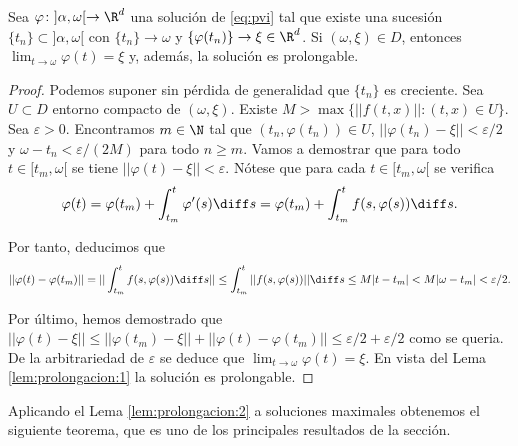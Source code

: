 \documentclass{article}
\begin{document}
\begin{lemma}\label{lem:prolongacion:2}
  Sea $\varphi \colon ]\alpha, \omega[ \to \R^d$ una solución de \eqref{eq:pvi} tal que existe una
  sucesión $\{t_n\} \subset ]\alpha, \omega[$ con $\{t_n\} \to \omega$ y
  $\{\varphi(t_n)\} \to \xi \in \R^d$. Si $(\omega, \xi) \in D$, entonces
  $\lim_{t \to \omega} \varphi(t) = \xi$ y, además, la solución es prolongable.
\end{lemma}
\begin{proof}
  Podemos suponer sin pérdida de generalidad que $\{t_n\}$ es creciente. Sea $U \subset D$ entorno
  compacto de $(\omega, \xi)$. Existe $M > \max \{||f(t,x)||: (t,x) \in U\}$. Sea $\varepsilon >
  0$. Encontramos $m \in \N$ tal que $(t_n,\varphi(t_n)) \in U$,
  $||\varphi(t_n) - \xi|| < \varepsilon /2$ y $\omega -t_n < \varepsilon / (2M)$ para todo
  $n \ge m$.  Vamos a demostrar que para todo $t \in [t_m, \omega[$ se tiene
  $||\varphi(t) - \xi|| < \varepsilon$.  Nótese que para cada $t \in [t_m, \omega[$ se verifica
  \[\varphi(t) = \varphi(t_m) + \int_{t_m}^{t} \varphi'(s) \diff s = \varphi(t_m) +
    \int_{t_m}^{t} f(s,\varphi(s)) \diff s.\]

  Por tanto, deducimos que
  \[ ||\varphi(t)-\varphi(t_m)|| = ||\int_{t_m}^{t} f(s,\varphi(s)) \diff s|| \le \int_{t_m}^{t}
    ||f(s,\varphi(s))|| \diff s \le M |t-t_m| < M |\omega-t_m| < \varepsilon/2.\]
  
  Por último, hemos demostrado que
  $||\varphi(t) - \xi|| \le ||\varphi(t_m) - \xi|| + ||\varphi(t)-\varphi(t_m)|| \le \varepsilon / 2
  + \varepsilon/2$ como se queria. De la arbitrariedad de $\varepsilon$ se deduce que
  $\lim_{t \to \omega} \varphi(t) = \xi$. En vista del Lema \ref{lem:prolongacion:1} la solución es
  prolongable.
\end{proof}

Aplicando el Lema \ref{lem:prolongacion:2} a soluciones maximales obtenemos el siguiente teorema,
que es uno de los principales resultados de la sección.
\end{document}
